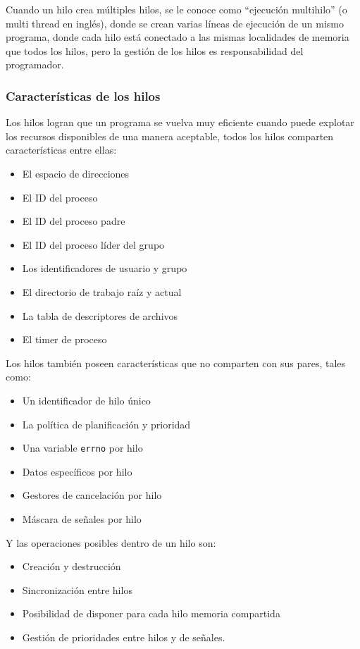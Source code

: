 Cuando un hilo crea múltiples hilos, se le conoce como ``ejecución multihilo'' (o multi thread en inglés), donde se crean varias líneas de ejecución de un mismo programa, donde cada hilo está conectado a las mismas localidades de memoria que todos los hilos, pero la gestión de los hilos es responsabilidad del programador.

\subsubsection{Características de los hilos}

Los hilos logran que un programa se vuelva muy eficiente cuando puede explotar los recursos disponibles de una manera aceptable, todos los hilos comparten características entre ellas:

\begin{itemize}
	\item   El espacio de direcciones
	\item   El ID del proceso
	\item   El ID del proceso padre
	\item   El ID del proceso líder del grupo
	\item   Los identificadores de usuario y grupo
	\item   El directorio de trabajo raíz y actual
	\item   La tabla de descriptores de archivos
	\item   El timer de proceso
\end{itemize}

Los hilos también poseen características que no comparten con sus pares, tales como:

\begin{itemize}
	\item   Un identificador de hilo único
	\item   La política de planificación y prioridad
	\item   Una variable \texttt{errno} por hilo
	\item   Datos específicos por hilo
	\item   Gestores de cancelación por hilo
	\item   Máscara de señales por hilo
\end{itemize}

Y las operaciones posibles dentro de un hilo son:

\begin{itemize}
	\item   Creación y destrucción
	\item   Sincronización entre hilos
	\item   Posibilidad de disponer para cada hilo memoria compartida
	\item   Gestión de prioridades entre hilos y de señales.
\end{itemize}

